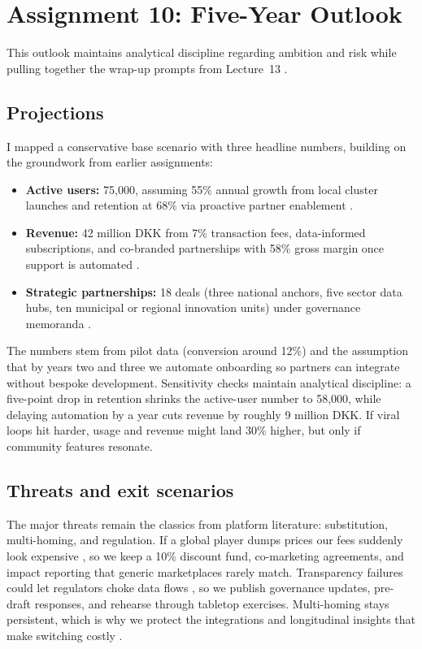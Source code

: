 \section*{Assignment 10: Five-Year Outlook}

This outlook maintains analytical discipline regarding ambition and risk while pulling together the wrap-up prompts from Lecture~13 \citep{Lecture13}.

\subsection*{Projections}
I mapped a conservative base scenario with three headline numbers, building on the groundwork from earlier assignments:
\begin{itemize}
  \item \textbf{Active users:} 75,000, assuming 55\% annual growth from local cluster launches and retention at 68\% via proactive partner enablement \citep{Choudary2016,Srnicek2017}.
  \item \textbf{Revenue:} 42 million DKK from 7\% transaction fees, data-informed subscriptions, and co-branded partnerships with 58\% gross margin once support is automated \citep{ShapiroVarian1999}.
  \item \textbf{Strategic partnerships:} 18 deals (three national anchors, five sector data hubs, ten municipal or regional innovation units) under governance memoranda \citep{Reillier2017}.
\end{itemize}

The numbers stem from pilot data (conversion around 12\%) and the assumption that by years two and three we automate onboarding so partners can integrate without bespoke development. Sensitivity checks maintain analytical discipline: a five-point drop in retention shrinks the active-user number to 58,000, while delaying automation by a year cuts revenue by roughly 9 million DKK. If viral loops hit harder, usage and revenue might land 30\% higher, but only if community features resonate.

\subsection*{Threats and exit scenarios}
The major threats remain the classics from platform literature: substitution, multi-homing, and regulation. If a global player dumps prices our fees suddenly look expensive \citep{Porter2008}, so we keep a 10\% discount fund, co-marketing agreements, and impact reporting that generic marketplaces rarely match. Transparency failures could let regulators choke data flows \citep{Srnicek2017}, so we publish governance updates, pre-draft responses, and rehearse through tabletop exercises. Multi-homing stays persistent, which is why we protect the integrations and longitudinal insights that make switching costly \citep{FarrellSaloner1986}.


